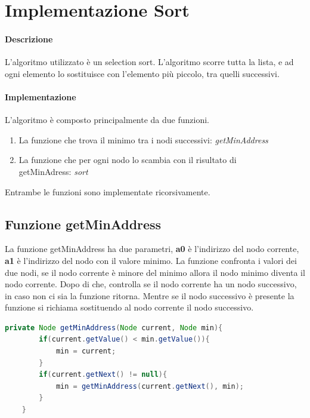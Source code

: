 \section{Implementazione Sort}

\paragraph{Descrizione}
L'algoritmo utilizzato è un selection sort. 
L'algoritmo scorre tutta la lista, e ad ogni elemento lo sostituisce
 con l'elemento più piccolo, tra quelli successivi.

\paragraph{Implementazione}
L'algoritmo è composto principalmente da due funzioni. 
\begin{enumerate}
    \item \label{func:getMinAddress}La funzione che trova il minimo tra i nodi successivi: \textit{getMinAddress}
    \item \label{func:sort}La funzione che per ogni nodo lo scambia con il risultato di \\getMinAdress: \textit{sort}
\end{enumerate}
Entrambe le funzioni sono implementate ricorsivamente.
\subsection{Funzione getMinAddress}
La funzione getMinAddress ha due parametri, 
\textbf{a0} è l'indirizzo del nodo corrente, \textbf{a1} è l'indirizzo del nodo con il valore minimo.
La funzione confronta i valori dei due nodi, se il nodo corrente è minore del minimo allora il nodo minimo diventa il nodo corrente.
Dopo di che, controlla se il nodo corrente ha un nodo successivo, in caso non ci sia la funzione ritorna. Mentre se il nodo successivo è presente
la funzione si richiama sostituendo al nodo corrente il nodo successivo.
\\

\begin{lstlisting}[language=java,caption={Codice java algoritmo getMinAddress},captionpos=b] 
    private Node getMinAddress(Node current, Node min){
        if(current.getValue() < min.getValue()){
            min = current;
        }
        if(current.getNext() != null){
            min = getMinAddress(current.getNext(), min);
        }
    }


\end{lstlisting}

